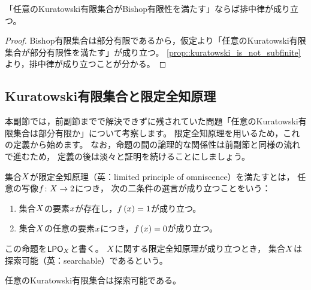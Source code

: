 \begin{proposition}\label{prop::kuratowski_is_not_bishop}
    「任意のKuratowski有限集合がBishop有限性を満たす」ならば排中律が成り立つ。
\end{proposition}

\begin{proof}
    Bishop有限集合は部分有限であるから，仮定より「任意のKuratowski有限集合が部分有限性を満たす」が成り立つ。
    \cref{prop::kuratowski_is_not_subfinite}より，排中律が成り立つことが分かる。
\end{proof}

\subsection{Kuratowski有限集合と限定全知原理}

本副節では，前副節までで解決できずに残されていた問題「任意のKuratowski有限集合は部分有限か」について考察します。
限定全知原理を用いるため，これの定義から始めます。
なお，命題の間の論理的な関係性は前副節と同様の流れで進むため，
定義の後は淡々と証明を続けることにしましょう。

\begin{definition}
    集合\(\Set\)が限定全知原理（英：limited principle of omniscence）を満たすとは，
    任意の写像\(\FunctionStyle{\Map}{\Set}{\NaturalNumber<2>}\)につき，
    次の二条件の選言が成り立つことをいう：
    \begin{enumerate}
        \item 集合\(\Set\)の要素\(\Element\)が存在し，\(\Map(\Element)=\NaturalNumber<1>\)が成り立つ。
        \item 集合\(\Set\)の任意の要素\(\Element\)につき，\(\Map(\Element)=\NaturalNumber<0>\)が成り立つ。
    \end{enumerate}
    この命題を\(\LPO_{\Set}\)と書く。
    \(\Set\)に関する限定全知原理が成り立つとき，
    集合\(\Set\)は探索可能（英：searchable）であるという。
\end{definition}

\begin{proposition}\label{prop::all_kuratowski_finite_has_searchability}
    任意のKuratowski有限集合は探索可能である。
\end{proposition}

